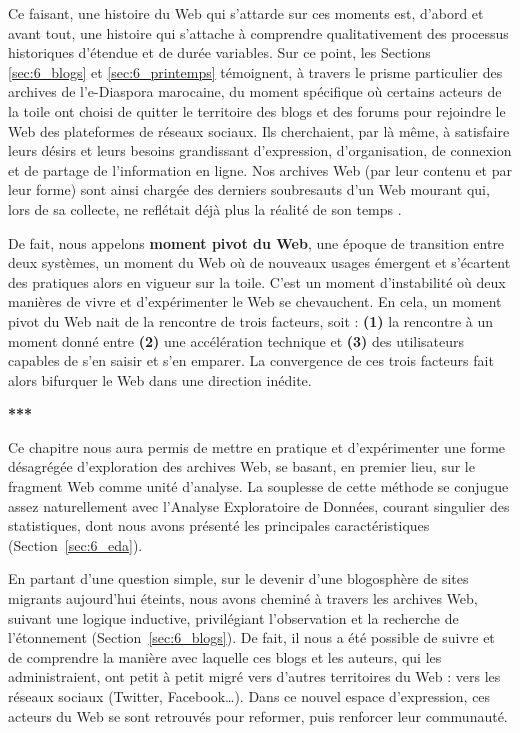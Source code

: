 \documentclass[symmetric,justified,marginals=raggedouter]{tufte-book}
\begin{document}
Ce faisant, une histoire du Web qui s'attarde sur ces moments est, d'abord et avant tout, une histoire qui s'attache à comprendre qualitativement des processus historiques d'étendue et de durée variables. Sur ce point, les Sections \ref{sec:6_blogs} et \ref{sec:6_printemps} témoignent, à travers le prisme particulier des archives de l'e-Diaspora marocaine, du moment spécifique où certains acteurs de la toile ont choisi de quitter le territoire des blogs et des forums pour rejoindre le Web des plateformes de réseaux sociaux. Ils cherchaient, par là même, à satisfaire leurs désirs et leurs besoins grandissant d'expression, d'organisation, de connexion et de partage de l'information en ligne. Nos archives Web (par leur contenu et par leur forme) sont ainsi chargée des derniers soubresauts d'un Web mourant \citep{stevenson_hypertext_2018} qui, lors de sa collecte, ne reflétait déjà plus la réalité de son temps \citep{helmond_platformization_2015}.

De fait, nous appelons \textbf{moment pivot du Web}, une époque de transition entre deux systèmes, un moment du Web où de nouveaux usages émergent et s'écartent des pratiques alors en vigueur sur la toile. C'est un moment d'instabilité où deux manières de vivre et d'expérimenter le Web se chevauchent. En cela, un moment pivot du Web nait de la rencontre de trois facteurs, soit : \textbf{(1)} la rencontre à un moment donné entre \textbf{(2)} une accélération technique et \textbf{(3)} des utilisateurs capables de s'en saisir et s'en emparer. La convergence de ces trois facteurs fait alors bifurquer le Web dans une direction inédite.

\begin{center}
	\textbf{***}
\end{center}

\noindent Ce chapitre nous aura permis de mettre en pratique et d'expérimenter une forme désagrégée d'exploration des archives Web, se basant, en premier lieu, sur le fragment Web comme unité d'analyse. La souplesse de cette méthode se conjugue assez naturellement avec l'Analyse Exploratoire de Données, courant singulier des statistiques, dont nous avons présenté les principales caractéristiques (Section~\ref{sec:6_eda}).

En partant d'une question simple, sur le devenir d'une blogosphère de sites migrants aujourd'hui éteints, nous avons cheminé à travers les archives Web, suivant une logique inductive, privilégiant l'observation et la recherche de l'étonnement (Section~\ref{sec:6_blogs}). De fait, il nous a été possible de suivre et de comprendre la manière avec laquelle ces blogs et les auteurs, qui les administraient, ont petit à petit migré vers d'autres territoires du Web : vers les réseaux sociaux (Twitter, Facebook\ldots{}). Dans ce nouvel espace d'expression, ces acteurs du Web se sont retrouvés pour reformer, puis renforcer leur communauté. 
\end{document}
